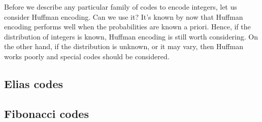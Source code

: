 \documentclass{subfiles}
\begin{document}
    Before we describe any particular family of codes to encode integers, 
        let us consider Huffman encoding. Can we use it?
        It's known by now that Huffman encoding performs well when the probabilities 
        are known a priori. Hence, if the distribution of integers is known, 
        Huffman encoding is still worth considering. On the other hand,
        if the distribution is unknown, or it may vary, then Huffman works poorly
        and special codes should be considered.

    \subsection{Elias codes}
    

    \subsection{Fibonacci codes}
    
\end{document}
